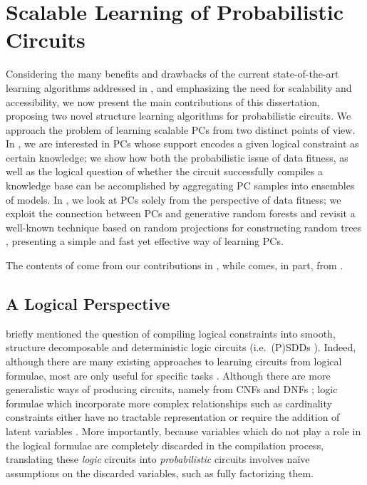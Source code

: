 \chapter{Scalable Learning of Probabilistic Circuits}
\label{ch:scalable}

Considering the many benefits and drawbacks of the current state-of-the-art learning algorithms
addressed in , and emphasizing the need for scalability and accessibility, we now
present the main contributions of this dissertation, proposing two novel structure learning
algorithms for probabilistic circuits. We approach the problem of learning scalable PCs from two
distinct points of view. In , we are interested in PCs whose support encodes a
given logical constraint as certain knowledge; we show how both the probabilistic issue of data
fitness, as well as the logical question of whether the circuit successfully compiles a knowledge
base can be accomplished by aggregating PC samples into ensembles of models. In , we
look at PCs solely from the perspective of data fitness; we exploit the connection between PCs and
generative random forests \citep{correia20,ho95} and revisit a well-known technique based on random
projections for constructing random trees \citep{dasgupta08a,dasgupta08b}, presenting a simple and
fast yet effective way of learning PCs.

The contents of  come from our contributions in \citet{geh21a}, while
 comes, in part, from \citet{geh21b}.

\section{A Logical Perspective}
\label{sec:logical}

 briefly mentioned the question of compiling logical constraints into smooth,
structure decomposable and deterministic logic circuits (i.e.\ (P)SDDs \cite{darwiche11,kisa14}).
Indeed, although there are many existing approaches to learning circuits from logical formulae,
most are only useful for specific tasks \citep{choi16,choi15,shen17,choi17}. Although there are
more generalistic ways of producing circuits, namely from CNFs and DNFs \citep{oztok15,choi13};
logic formulae which incorporate more complex relationships such as cardinality constraints either
have no tractable representation \citep{nishino16} or require the addition of latent variables
\citep{sinz05}. More importantly, because variables which do not play a role in the logical
formulae are completely discarded in the compilation process, translating these \emph{logic}
circuits into \emph{probabilistic} circuits involves naïve assumptions on the discarded variables,
such as fully factorizing them.

